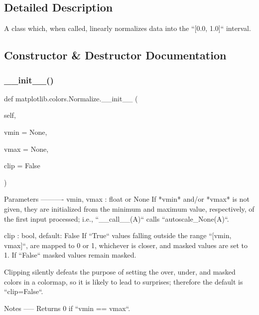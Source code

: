 \subsection{Detailed Description}
\begin{DoxyVerb}A class which, when called, linearly normalizes data into the
``[0.0, 1.0]`` interval.
\end{DoxyVerb}
 

\subsection{Constructor \& Destructor Documentation}
\mbox{\label{classmatplotlib_1_1colors_1_1Normalize_ae35ef95606b0b77e11efa41e07041133}} 
\subsubsection{\texorpdfstring{\+\_\+\+\_\+init\+\_\+\+\_\+()}{\_\_init\_\_()}}
{\footnotesize\ttfamily def matplotlib.\+colors.\+Normalize.\+\_\+\+\_\+init\+\_\+\+\_\+ (\begin{DoxyParamCaption}\item[{}]{self,  }\item[{}]{vmin = {\ttfamily None},  }\item[{}]{vmax = {\ttfamily None},  }\item[{}]{clip = {\ttfamily False} }\end{DoxyParamCaption})}

\begin{DoxyVerb}Parameters
----------
vmin, vmax : float or None
    If *vmin* and/or *vmax* is not given, they are initialized from the
    minimum and maximum value, respectively, of the first input
    processed; i.e., ``__call__(A)`` calls ``autoscale_None(A)``.

clip : bool, default: False
    If ``True`` values falling outside the range ``[vmin, vmax]``,
    are mapped to 0 or 1, whichever is closer, and masked values are
    set to 1.  If ``False`` masked values remain masked.

    Clipping silently defeats the purpose of setting the over, under,
    and masked colors in a colormap, so it is likely to lead to
    surprises; therefore the default is ``clip=False``.

Notes
-----
Returns 0 if ``vmin == vmax``.
\end{DoxyVerb}
 

